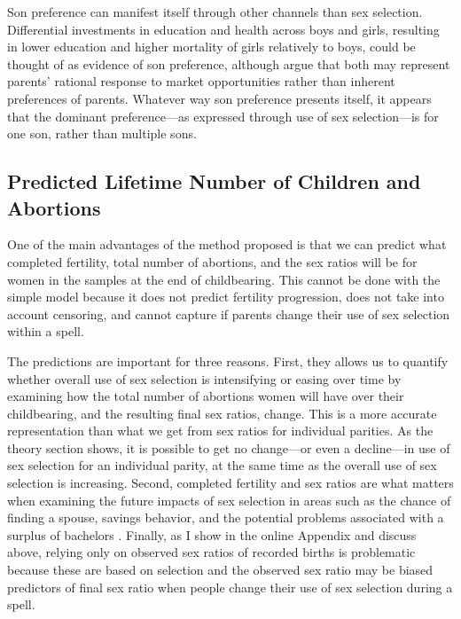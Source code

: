 \documentclass[12pt,letterpaper]{article}
\begin{document}
Son preference can manifest itself through other channels than sex selection.
Differential investments in education and health across boys and girls, resulting in
lower education and higher mortality of girls relatively to boys, could be thought 
of as evidence of son preference, although \cite{rosenzweig82} argue that both may 
represent parents' rational response to market opportunities rather than inherent 
preferences of parents.
Whatever way son preference presents itself, it appears that the dominant  
preference---as expressed through use of sex selection---is for one son, rather 
than multiple sons.


\subsection{Predicted Lifetime Number of Children and Abortions}

One of the main advantages of the method proposed is that we can predict what 
completed fertility, total number of abortions, and the sex ratios will be for 
women in the samples at the end of childbearing. 
This cannot be done with the simple model because it does not predict fertility
progression, does not take into account censoring, and cannot capture if parents
change their use of sex selection within a spell.

The predictions are important for three reasons.
First, they allows us to quantify whether overall use of sex selection is 
intensifying or easing over time by examining how the total number of abortions 
women will have over their childbearing, and the resulting final sex ratios, change.
This is a more accurate representation than what we get from sex ratios 
for individual parities.
As the theory section shows, it is possible to get no change---or even a 
decline---in use of sex selection for an individual parity, at the same time 
as the overall use of sex selection is increasing.
Second, completed fertility and sex ratios are what matters when examining the future 
impacts of sex selection in areas such as the chance of finding a spouse, savings 
behavior, and the potential problems associated with a surplus of bachelors 
\citep{lancaster02,Ding2009,Wei2009,Edlund2013}.
Finally, as I show in the online Appendix and discuss above, relying only on observed 
sex ratios of recorded births is problematic because these are based on selection and 
the observed sex ratio may be biased predictors of final sex ratio when people change 
their use of sex selection during a spell.
\end{document}
